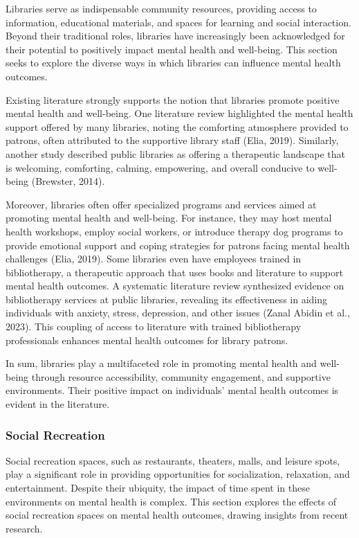 \documentclass[
  letterpaper,
  number,
  review,
  3p]{elsarticle}
\begin{document}
Libraries serve as indispensable community resources, providing access
to information, educational materials, and spaces for learning and
social interaction. Beyond their traditional roles, libraries have
increasingly been acknowledged for their potential to positively impact
mental health and well-being. This section seeks to explore the diverse
ways in which libraries can influence mental health outcomes.

Existing literature strongly supports the notion that libraries promote
positive mental health and well-being. One literature review highlighted
the mental health support offered by many libraries, noting the
comforting atmosphere provided to patrons, often attributed to the
supportive library staff (Elia, 2019). Similarly, another study
described public libraries as offering a therapeutic landscape that is
welcoming, comforting, calming, empowering, and overall conducive to
well-being (Brewster, 2014).

Moreover, libraries often offer specialized programs and services aimed
at promoting mental health and well-being. For instance, they may host
mental health workshops, employ social workers, or introduce therapy dog
programs to provide emotional support and coping strategies for patrons
facing mental health challenges (Elia, 2019). Some libraries even have
employees trained in bibliotherapy, a therapeutic approach that uses
books and literature to support mental health outcomes. A systematic
literature review synthesized evidence on bibliotherapy services at
public libraries, revealing its effectiveness in aiding individuals with
anxiety, stress, depression, and other issues (Zanal Abidin et al.,
2023). This coupling of access to literature with trained bibliotherapy
professionals enhances mental health outcomes for library patrons.

In sum, libraries play a multifaceted role in promoting mental health
and well-being through resource accessibility, community engagement, and
supportive environments. Their positive impact on individuals' mental
health outcomes is evident in the literature.

\subsubsection{Social Recreation}\label{social-recreation}

Social recreation spaces, such as restaurants, theaters, malls, and
leisure spots, play a significant role in providing opportunities for
socialization, relaxation, and entertainment. Despite their ubiquity,
the impact of time spent in these environments on mental health is
complex. This section explores the effects of social recreation spaces
on mental health outcomes, drawing insights from recent research.
\end{document}
